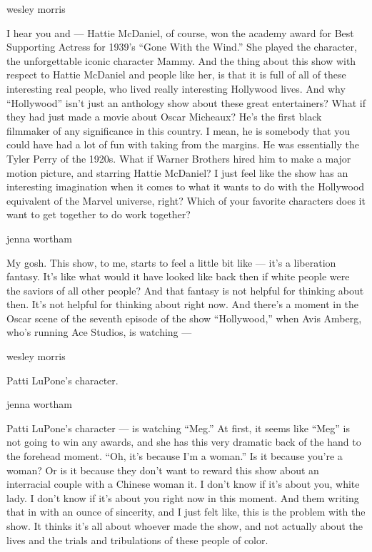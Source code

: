 wesley morris

I hear you and --- Hattie McDaniel, of course, won the academy award for
Best Supporting Actress for 1939's ``Gone With the Wind.'' She played
the character, the unforgettable iconic character Mammy. And the thing
about this show with respect to Hattie McDaniel and people like her, is
that it is full of all of these interesting real people, who lived
really interesting Hollywood lives. And why ``Hollywood'' isn't just an
anthology show about these great entertainers? What if they had just
made a movie about Oscar Micheaux? He's the first black filmmaker of any
significance in this country. I mean, he is somebody that you could have
had a lot of fun with taking from the margins. He was essentially the
Tyler Perry of the 1920s. What if Warner Brothers hired him to make a
major motion picture, and starring Hattie McDaniel? I just feel like the
show has an interesting imagination when it comes to what it wants to do
with the Hollywood equivalent of the Marvel universe, right? Which of
your favorite characters does it want to get together to do work
together?

jenna wortham

My gosh. This show, to me, starts to feel a little bit like --- it's a
liberation fantasy. It's like what would it have looked like back then
if white people were the saviors of all other people? And that fantasy
is not helpful for thinking about then. It's not helpful for thinking
about right now. And there's a moment in the Oscar scene of the seventh
episode of the show ``Hollywood,'' when Avis Amberg, who's running Ace
Studios, is watching ---

wesley morris

Patti LuPone's character.

jenna wortham

Patti LuPone's character --- is watching ``Meg.'' At first, it seems
like ``Meg'' is not going to win any awards, and she has this very
dramatic back of the hand to the forehead moment. ``Oh, it's because I'm
a woman.'' Is it because you're a woman? Or is it because they don't
want to reward this show about an interracial couple with a Chinese
woman it. I don't know if it's about you, white lady. I don't know if
it's about you right now in this moment. And them writing that in with
an ounce of sincerity, and I just felt like, this is the problem with
the show. It thinks it's all about whoever made the show, and not
actually about the lives and the trials and tribulations of these people
of color.

